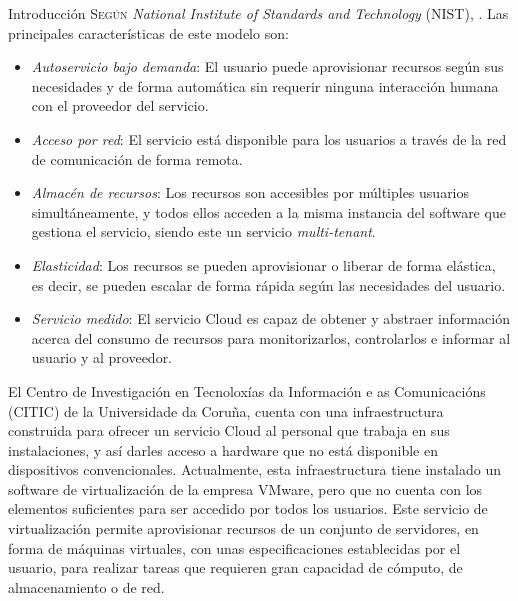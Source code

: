 \begin{chapter}{Introducción}
\label{chap:introducion}
\lettrine{S}{egún} \textit{National Institute of Standards and Technology} (NIST), \cite{computing}. Las principales características de este modelo son\label{nist}:
\begin{itemize}
    \item \emph{Autoservicio bajo demanda}: El usuario puede aprovisionar recursos según sus necesidades y de forma automática sin requerir ninguna interacción humana con el proveedor del servicio.
    \item \emph{Acceso por red}: El servicio está disponible para los usuarios a través de la red de comunicación de forma remota.
    \item \emph{Almacén de recursos}: Los recursos son accesibles por múltiples usuarios simultáneamente, y todos ellos acceden a la misma instancia del software que gestiona el servicio, siendo este un servicio \textit{multi-tenant}.
    \item \emph{Elasticidad}: Los recursos se pueden aprovisionar o liberar de forma elástica, es decir, se pueden escalar de forma rápida según las necesidades del usuario.
    \item \emph{Servicio medido}: El servicio Cloud es capaz de obtener y abstraer información acerca del consumo de recursos para monitorizarlos, controlarlos e informar al usuario y al proveedor.
\end{itemize}

 El Centro de Investigación en Tecnoloxías da Información e as Comunicacións (CITIC) de la Universidade da Coruña, cuenta con una infraestructura construida para ofrecer un servicio Cloud al personal que trabaja en sus instalaciones, y así darles acceso a hardware que no está disponible en dispositivos convencionales. Actualmente, esta infraestructura tiene instalado un software de virtualización de la empresa VMware, pero que no cuenta con los elementos suficientes para ser accedido por todos los usuarios. Este servicio de virtualización permite aprovisionar recursos de un conjunto de servidores, en forma de máquinas virtuales, con unas especificaciones establecidas por el usuario, para realizar tareas que requieren gran capacidad de cómputo, de almacenamiento o de red.


\end{chapter}
